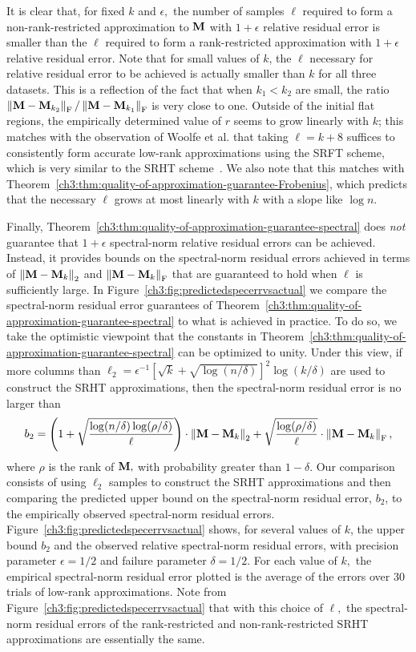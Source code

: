 It is clear that, for fixed $k$ and $\epsilon,$ the number of samples $\ell$ required 
to form a non-rank-restricted approximation to $\mathbf{M}$ with $1+\epsilon$ relative 
residual error is smaller than the $\ell$ required to form a rank-restricted approximation 
with $1+\epsilon$ relative residual error. Note that for small values of $k$, the 
$\ell$ necessary for relative residual error to be achieved is actually smaller than $k$ for 
all three datasets. This is a reflection of the fact that when $k_1 < k_2$ are small, the 
ratio $\left\|\mathbf{M} - \mathbf{M}_{k_2}\right\|_\mathrm{F}/\left\|\mathbf{M} - \mathbf{M}_{k_1}\right\|_\mathrm{F}$ is very close to one. Outside 
of the initial flat regions, the empirically determined value of $r$ seems to grow linearly with $k$;
this matches with the observation of Woolfe et al. that taking $\ell=k+8$ suffices to 
consistently form accurate low-rank approximations using the SRFT scheme, which is 
very similar to the SRHT scheme~\cite{WLRT08}. We also note that this matches with 
Theorem~\ref{ch3:thm:quality-of-approximation-guarantee-Frobenius}, which predicts that the 
necessary $\ell$ grows at most linearly with $k$ with a slope like $\log n.$

Finally, Theorem~\ref{ch3:thm:quality-of-approximation-guarantee-spectral} does \emph{not} guarantee 
that $1+\epsilon$ spectral-norm relative residual errors can be achieved. Instead, it 
provides bounds on the spectral-norm residual errors achieved in terms of 
$\left\|\mathbf{M} - \mathbf{M}_k\right\|_2$ and $\left\|\mathbf{M} - \mathbf{M}_k\right\|_\mathrm{F}$ that are guaranteed to hold when 
$\ell$ is sufficiently large. In Figure~\ref{ch3:fig:predictedspecerrvsactual} we compare the 
spectral-norm residual error guarantees of Theorem~\ref{ch3:thm:quality-of-approximation-guarantee-spectral} 
to what is achieved in practice. To do so, we take the optimistic viewpoint that the constants 
in Theorem~\ref{ch3:thm:quality-of-approximation-guarantee-spectral} can be optimized to unity. Under 
this view, if more columns than $\ell_2 = \epsilon^{-1} [\sqrt{k} + \sqrt{\log(n/\delta)}]^2 \log(k/\delta)$ 
are used to construct the SRHT approximations, then the spectral-norm residual error is no larger than
\[
 b_2 = \left(1 + \sqrt{\frac{\log(n/\delta) \log(\rho/\delta)}{\ell}}\right) \cdot 
 \left\|\mathbf{M} - \mathbf{M}_k\right\|_2 + \sqrt{\frac{\log(\rho/\delta)}{\ell}} \cdot \left\|\mathbf{M} - \mathbf{M}_k\right\|_\mathrm{F},
\]
where $\rho$ is the rank of $\mathbf{M},$ with probability greater than $1-\delta.$ Our comparison consists of 
using $\ell_2$ samples to construct the SRHT approximations and then comparing the predicted upper bound on 
the spectral-norm residual error, $b_2$, to the empirically observed spectral-norm residual errors. 
Figure~\ref{ch3:fig:predictedspecerrvsactual} shows, for several values of $k$, the upper bound $b_2$ and 
the observed relative spectral-norm residual errors, with precision parameter $\epsilon = 1/2$ and 
failure parameter $\delta = 1/2.$ For each value of $k,$ the empirical spectral-norm residual error plotted 
is the average of the errors over 30 trials of low-rank approximations. Note from 
Figure~\ref{ch3:fig:predictedspecerrvsactual} that with this choice of $\ell,$ the spectral-norm residual errors 
of the rank-restricted and non-rank-restricted SRHT approximations are essentially the same.

